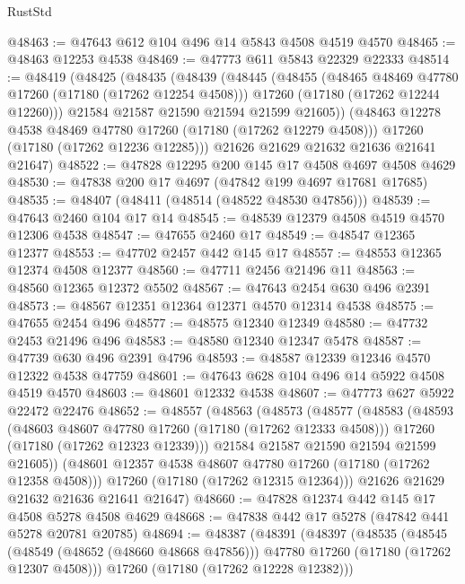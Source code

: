 \begin{lexlean}{RustStd}
\begin{coremodule}
@48463 := @47643 @612 @104 @496 @14 @5843 @4508 @4519 @4570
@48465 := @48463 @12253 @4538
@48469 := @47773 @611 @5843 @22329 @22333
@48514 := @48419
    (@48425
      (@48435
        (@48439
          (@48445
            (@48455
              (@48465 @48469 @47780 @17260 (@17180 (@17262 @12254 @4508)))
              @17260
              (@17180 (@17262 @12244 @12260)))
            @21584
            @21587
            @21590
            @21594
            @21599
            @21605))
        (@48463 @12278 @4538 @48469 @47780 @17260 (@17180 (@17262 @12279 @4508)))
        @17260
        (@17180 (@17262 @12236 @12285)))
      @21626
      @21629
      @21632
      @21636
      @21641
      @21647)
@48522 := @47828 @12295 @200 @145 @17 @4508 @4697 @4508 @4629
@48530 := @47838 @200 @17 @4697 (@47842 @199 @4697 @17681 @17685)
@48535 := @48407 (@48411 (@48514 (@48522 @48530 @47856)))
@48539 := @47643 @2460 @104 @17 @14
@48545 := @48539 @12379 @4508 @4519 @4570 @12306 @4538
@48547 := @47655 @2460 @17
@48549 := @48547 @12365 @12377
@48553 := @47702 @2457 @442 @145 @17
@48557 := @48553 @12365 @12374 @4508 @12377
@48560 := @47711 @2456 @21496 @11
@48563 := @48560 @12365 @12372 @5502
@48567 := @47643 @2454 @630 @496 @2391
@48573 := @48567 @12351 @12364 @12371 @4570 @12314 @4538
@48575 := @47655 @2454 @496
@48577 := @48575 @12340 @12349
@48580 := @47732 @2453 @21496 @496
@48583 := @48580 @12340 @12347 @5478
@48587 := @47739 @630 @496 @2391 @4796
@48593 := @48587 @12339 @12346 @4570 @12322 @4538 @47759
@48601 := @47643 @628 @104 @496 @14 @5922 @4508 @4519 @4570
@48603 := @48601 @12332 @4538
@48607 := @47773 @627 @5922 @22472 @22476
@48652 := @48557
    (@48563
      (@48573
        (@48577
          (@48583
            (@48593
              (@48603 @48607 @47780 @17260 (@17180 (@17262 @12333 @4508)))
              @17260
              (@17180 (@17262 @12323 @12339)))
            @21584
            @21587
            @21590
            @21594
            @21599
            @21605))
        (@48601 @12357 @4538 @48607 @47780 @17260 (@17180 (@17262 @12358 @4508)))
        @17260
        (@17180 (@17262 @12315 @12364)))
      @21626
      @21629
      @21632
      @21636
      @21641
      @21647)
@48660 := @47828 @12374 @442 @145 @17 @4508 @5278 @4508 @4629
@48668 := @47838 @442 @17 @5278 (@47842 @441 @5278 @20781 @20785)
@48694 := @48387
    (@48391
      (@48397
        (@48535
          (@48545
            (@48549 (@48652 (@48660 @48668 @47856)))
            @47780
            @17260
            (@17180 (@17262 @12307 @4508)))
          @17260
          (@17180 (@17262 @12228 @12382)))

\end{coremodule}
\end{lexlean}
